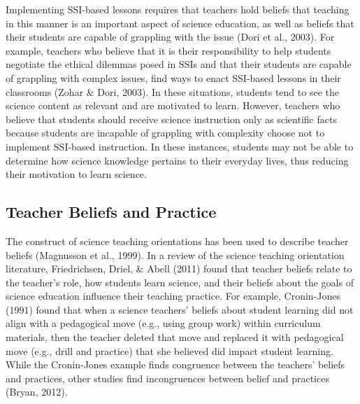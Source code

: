 \documentclass[11.5pt]{sig-alternate}
\begin{document}
\begin{large}
Implementing SSI-based lessons requires that teachers hold beliefs that teaching in this manner is an important aspect of science education, as well as beliefs that their students are capable of grappling with the issue (Dori et al., 2003). For example, teachers who believe that it is their responsibility to help students negotiate the ethical dilemmas posed in SSIs and that their students are capable of grappling with complex issues, find ways to enact SSI-based lessons in their classrooms (Zohar \& Dori, 2003). In these situations, students tend to see the science content as relevant and are motivated to learn. However, teachers who believe that students should receive science instruction only as scientific facts because students are incapable of grappling with complexity choose not to implement SSI-based instruction. In these instances, students may not be able to determine how science knowledge pertains to their everyday lives, thus reducing their motivation to learn science.

\subsection*{Teacher Beliefs and Practice}

The construct of science teaching orientations has been used to describe teacher beliefs (Magnusson et al., 1999). In a review of the science teaching orientation literature, Friedrichsen, Driel, \& Abell (2011) found that teacher beliefs relate to the teacher’s role, how students learn science, and their beliefs about the goals of science education influence their teaching practice. For example, Cronin-Jones (1991) found that when a science teachers’ beliefs about student learning did not align with a pedagogical move (e.g., using group work) within curriculum materials, then the teacher deleted that move and replaced it with pedagogical move (e.g., drill and practice) that she believed did impact student learning. While the Cronin-Jones example finds congruence between the teachers’ beliefs and practices, other studies find incongruences between belief and practices \\(Bryan, 2012).


\end{large}
\end{document}
